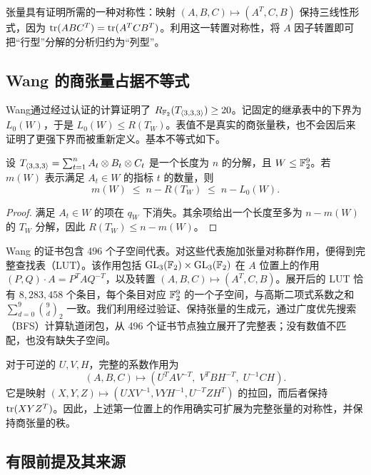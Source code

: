 \documentclass[11pt,a4paper]{article}
\begin{document}
张量具有证明所需的一种对称性：映射 $(A,B,C)\mapsto(A^T,C,B)$ 保持三线性形式，因为 $\operatorname{tr}(ABC^T)=\operatorname{tr}(A^TCB^T)$。利用这一转置对称性，将 $A$ 因子转置即可把“行型”分解的分析归约为“列型”。

\subsection{Wang 的商张量占据不等式}

Wang\cite{wangautomated}通过经过认证的计算证明了 $R_{\mathbb{F}_2}(T_{\langle3,3,3\rangle})\ge20$。记固定的继承表中的下界为 $L_0(W)$，于是 $L_0(W)\le R(T_W)$。表值不是真实的商张量秩，也不会因后来证明了更强下界而被重新定义。基本不等式如下。

\begin{proposition}[占据不等式]\label{prop:occupation}
  设 $T_{\langle3,3,3\rangle}=\sum_{t=1}^n A_t\otimes B_t\otimes C_t$ 是一个长度为 $n$ 的分解，且 $W\le\mathbb{F}_2^9$。若 $m(W)$ 表示满足 $A_t\in W$ 的指标 $t$ 的数量，则
  \begin{equation}\label{eq:occ}
    m(W)\;\le\; n-R(T_W)\;\le\;n-L_0(W).
  \end{equation}
\end{proposition}

\begin{proof}
  满足 $A_t\in W$ 的项在 $q_W$ 下消失。其余项给出一个长度至多为 $n-m(W)$ 的 $T_W$ 分解，因此 $R(T_W)\le n-m(W)$。
\end{proof}

Wang 的证书包含 496 个子空间代表。对这些代表施加张量对称群作用，便得到完整查找表（LUT）。该作用包括 $\operatorname{GL}_3(\mathbb{F}_2)\times\operatorname{GL}_3(\mathbb{F}_2)$ 在 $A$ 位置上的作用 $(P,Q)\cdot A=P^TAQ^{-T}$，以及转置 $(A,B,C)\mapsto(A^T,C,B)$。展开后的 LUT 恰有 $8{,}283{,}458$ 个条目，每个条目对应 $\mathbb{F}_2^9$ 的一个子空间，与高斯二项式系数之和 $\sum_{d=0}^9\binom{9}{d}_2$ 一致。我们利用经过验证、保持张量的生成元，通过广度优先搜索（BFS）计算轨道闭包，从 496 个证书节点独立展开了完整表；没有数值不匹配，也没有缺失子空间。

对于可逆的 $U,V,H$，完整的系数作用为
\begin{equation}\label{eq:coefficient-action}
 (A,B,C)\longmapsto
 (U^TAV^{-T},\;V^TBH^{-T},\;U^{-1}CH).
\end{equation}
它是映射 $(X,Y,Z)\mapsto(UXV^{-1},VYH^{-1},U^{-T}ZH^T)$ 的拉回，而后者保持 $\operatorname{tr}(XYZ^T)$。因此，上述第一位置上的作用确实可扩展为完整张量的对称性，并保持商张量的秩。

\subsection{有限前提及其来源}
\end{document}
